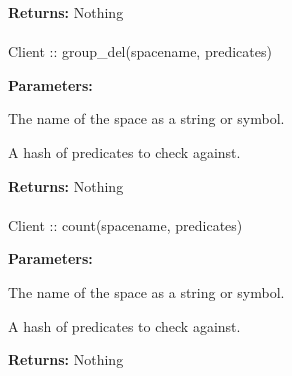 \noindent\textbf{Returns:}
Nothing

\paragraph{}
\begin{ccode}
Client :: group_del(spacename, predicates)
\end{ccode}
\funcdesc 

\noindent\textbf{Parameters:}
\begin{description}[labelindent=\widthof{{predicates}},leftmargin=*,noitemsep,nolistsep,align=right]
\item[spacename] The name of the space as a string or symbol.
\item[predicates] A hash of predicates to check against.
\end{description}

\noindent\textbf{Returns:}
Nothing

\paragraph{}
\begin{ccode}
Client :: count(spacename, predicates)
\end{ccode}
\funcdesc 

\noindent\textbf{Parameters:}
\begin{description}[labelindent=\widthof{{predicates}},leftmargin=*,noitemsep,nolistsep,align=right]
\item[spacename] The name of the space as a string or symbol.
\item[predicates] A hash of predicates to check against.
\end{description}

\noindent\textbf{Returns:}
Nothing
